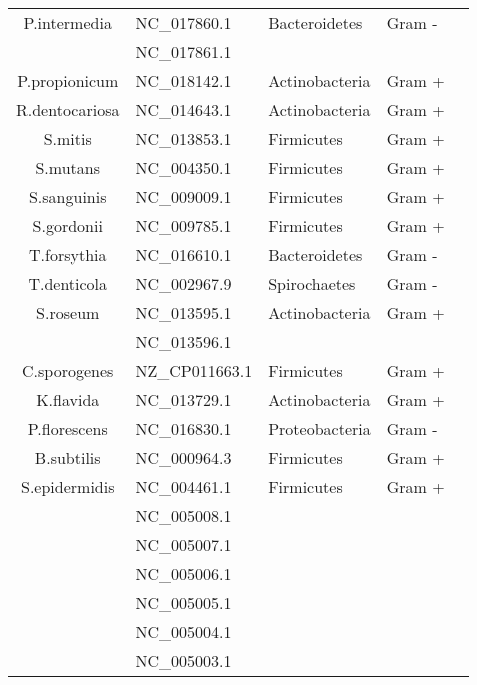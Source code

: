 \documentclass[12pt, a4paper]{article}
\begin{document}
\begin{appendices}
\begin{table}[ht]
\begin{tabular}{cllll}
  	P.intermedia & NC\_017860.1 & Bacteroidetes & Gram - \\
  	 & NC\_017861.1 & & \\
  	P.propionicum & NC\_018142.1 & Actinobacteria & Gram + \\ 
  	R.dentocariosa & NC\_014643.1 & Actinobacteria & Gram + \\ 
  	S.mitis & NC\_013853.1 & Firmicutes & Gram + \\ 
  	S.mutans & NC\_004350.1 & Firmicutes & Gram + \\ 
  	S.sanguinis & NC\_009009.1 & Firmicutes & Gram + \\ 
  	S.gordonii & NC\_009785.1 & Firmicutes & Gram + \\ 
  	T.forsythia & NC\_016610.1 & Bacteroidetes & Gram - \\ 
  	T.denticola & NC\_002967.9 & Spirochaetes & Gram - \\ 
  	S.roseum & NC\_013595.1 & Actinobacteria & Gram + \\ 
  	 & NC\_013596.1 & & \\
  	C.sporogenes & NZ\_CP011663.1 & Firmicutes & Gram + \\ 
  	K.flavida & NC\_013729.1 & Actinobacteria & Gram + \\ 
  	P.florescens & NC\_016830.1 & Proteobacteria & Gram - \\ 
  	B.subtilis & NC\_000964.3 & Firmicutes & Gram + \\ 
  	S.epidermidis & NC\_004461.1 & Firmicutes & Gram + \\ 
  	 & NC\_005008.1 & & \\
  	 & NC\_005007.1 & & \\
  	 & NC\_005006.1 & & \\
  	 & NC\_005005.1 & & \\
  	 & NC\_005004.1 & & \\
  	 & NC\_005003.1 & & \\
   \hline
\end{tabular}
\end{table}

\end{appendices}
\end{document}
